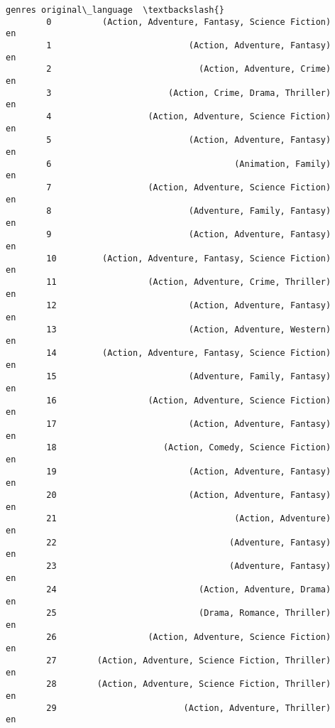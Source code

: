 \documentclass[11pt]{article}
\begin{document}
\begin{Verbatim}[commandchars=\\\{\}]
                                                          genres original\_language  \textbackslash{}
        0          (Action, Adventure, Fantasy, Science Fiction)                en   
        1                           (Action, Adventure, Fantasy)                en   
        2                             (Action, Adventure, Crime)                en   
        3                       (Action, Crime, Drama, Thriller)                en   
        4                   (Action, Adventure, Science Fiction)                en   
        5                           (Action, Adventure, Fantasy)                en   
        6                                    (Animation, Family)                en   
        7                   (Action, Adventure, Science Fiction)                en   
        8                           (Adventure, Family, Fantasy)                en   
        9                           (Action, Adventure, Fantasy)                en   
        10         (Action, Adventure, Fantasy, Science Fiction)                en   
        11                  (Action, Adventure, Crime, Thriller)                en   
        12                          (Action, Adventure, Fantasy)                en   
        13                          (Action, Adventure, Western)                en   
        14         (Action, Adventure, Fantasy, Science Fiction)                en   
        15                          (Adventure, Family, Fantasy)                en   
        16                  (Action, Adventure, Science Fiction)                en   
        17                          (Action, Adventure, Fantasy)                en   
        18                     (Action, Comedy, Science Fiction)                en   
        19                          (Action, Adventure, Fantasy)                en   
        20                          (Action, Adventure, Fantasy)                en   
        21                                   (Action, Adventure)                en   
        22                                  (Adventure, Fantasy)                en   
        23                                  (Adventure, Fantasy)                en   
        24                            (Action, Adventure, Drama)                en   
        25                            (Drama, Romance, Thriller)                en   
        26                  (Action, Adventure, Science Fiction)                en   
        27        (Action, Adventure, Science Fiction, Thriller)                en   
        28        (Action, Adventure, Science Fiction, Thriller)                en   
        29                         (Action, Adventure, Thriller)                en   

\end{Verbatim}
\end{document}
